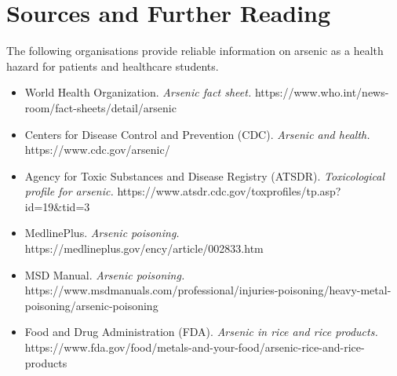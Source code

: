 \section*{Sources and Further Reading}
The following organisations provide reliable information on arsenic as a health hazard for patients and healthcare students.

\begin{itemize}
    \item World Health Organization. \textit{Arsenic fact sheet.} https://www.who.int/news-room/fact-sheets/detail/arsenic
    \item Centers for Disease Control and Prevention (CDC). \textit{Arsenic and health.} https://www.cdc.gov/arsenic/
    \item Agency for Toxic Substances and Disease Registry (ATSDR). \textit{Toxicological profile for arsenic.} https://www.atsdr.cdc.gov/toxprofiles/tp.asp?id=19\&tid=3
    \item MedlinePlus. \textit{Arsenic poisoning.} https://medlineplus.gov/ency/article/002833.htm
    \item MSD Manual. \textit{Arsenic poisoning.} https://www.msdmanuals.com/professional/injuries-poisoning/heavy-metal-poisoning/arsenic-poisoning
    \item Food and Drug Administration (FDA). \textit{Arsenic in rice and rice products.} https://www.fda.gov/food/metals-and-your-food/arsenic-rice-and-rice-products
\end{itemize}
